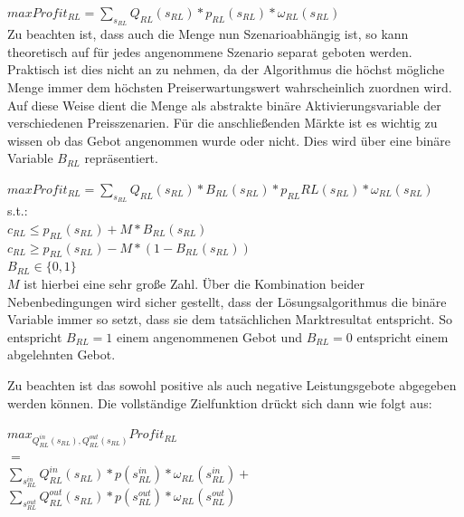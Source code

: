 \documentclass{article}
\begin{document}
$max Profit_{RL} = \sum_{s_{RL}} Q_{RL}(s_{RL}) * p_{RL}(s_{RL}) * \omega_{RL}(s_{RL})$\\

Zu beachten ist, dass auch die Menge nun Szenarioabhängig ist, so kann theoretisch auf für jedes angenommene Szenario separat geboten werden. Praktisch ist dies nicht an zu nehmen, da der Algorithmus die höchst mögliche Menge immer dem höchsten Preiserwartungswert wahrscheinlich zuordnen wird. Auf diese Weise dient die Menge als abstrakte binäre Aktivierungsvariable der verschiedenen Preisszenarien.
Für die anschließenden Märkte ist es wichtig zu wissen ob das Gebot angenommen wurde oder nicht. Dies wird über eine binäre Variable $B_{RL}$ repräsentiert.

$max Profit_{RL} = \sum_{s_{RL}} Q_{RL}(s_{RL}) * B_{RL}(s_{RL}) * p_{RL}{RL}(s_{RL}) * \omega_{RL}(s_{RL})$\\
s.t.:\\
$c_{RL} \leq p_{RL}(s_{RL}) + M * B_{RL}(s_{RL}) $\\
$c_{RL} \geq p_{RL}(s_{RL}) - M * (1 - B_{RL}(s_{RL})) $\\
$B_{RL} \in \{0,1\}$\\
$M$ ist hierbei eine sehr große Zahl. Über die Kombination beider Nebenbedingungen wird sicher gestellt, dass der Lösungsalgorithmus die binäre Variable immer so setzt, dass sie dem tatsächlichen Marktresultat entspricht. So entspricht $B_{RL} = 1$ einem angenommenen Gebot und $B_{RL} = 0$ entspricht einem abgelehnten Gebot.\\




Zu beachten ist das sowohl positive als auch negative Leistungsgebote abgegeben werden können. Die vollständige Zielfunktion drückt sich dann wie folgt aus:\\

\begin{center}
$max_{Q^{in}_{RL}(s_{RL}), Q^{out}_{RL}(s_{RL})} Profit_{RL}$\\ 
$=$\\
$\sum_{s^{in}_{RL}} Q^{in}_{RL}(s_{RL}) * p(s^{in}_{RL}) * \omega_{RL}(s^{in}_{RL}) +$\\
$\sum_{s^{out}_{RL}} Q^{out}_{RL}(s_{RL}) * p(s^{out}_{RL}) * \omega_{RL}(s^{out}_{RL})$\\
\end{center}
\end{document}
